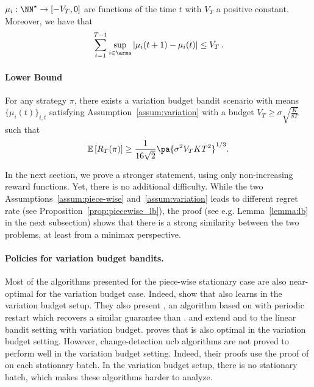 \begin{assumption}
\label{assum:variation}
$\mu_i : \NN^\star \rightarrow [- V_T, 0]$ are functions of the time $t$ with $V_T$ a positive constant. Moreover, we have that 
\begin{equation}
\label{eq:defbudget}
    \sum_{t=1}^{T-1} \sup_{i \in \arms} |\mu_i(t+1) - \mu_i(t) | \leq V_T\,.
\end{equation}
\end{assumption}


\paragraph{Lower Bound}
\begin{proposition}
\label{prop:variation_lb}
For any strategy $\pi$, there exists a  variation budget bandit scenario with means $\{\mu_i(t)\}_{i,t}$ satisfying Assumption~\ref{assum:variation} with a budget $V_T \geq \sigma \sqrt{\frac{K}{8T}}$ such that
%
\[
    \mathbb{E}\left[R_T(\pi)\right] \geq \frac{1}{16\sqrt{2}} \pa{\sigma^2 V_T KT^2}^{1/3}.
\]
\end{proposition}

In the next section, we prove a stronger statement, using only non-increasing reward functions. Yet, there is no additional difficulty. While the two Assumptions~\ref{assum:piece-wise} and~\ref{assum:variation} leads to different regret rate (see Proposition~\ref{prop:piecewise_lb}), the proof (see e.g. Lemma~\ref{lemma:lb} in the next subsection) shows that there is a strong similarity between the two problems, at least from a minimax perspective.

\paragraph{Policies for variation budget bandits.}
Most of the algorithms presented for the piece-wise stationary case are also near-optimal for the variation budget case. Indeed, \citet{besbes2014stochastic} show that \EXPS also learns in the variation budget setup. They also present \REXP, an algorithm based on \EXP with periodic restart which recovers a similar guarantee than \EXPS. \citet{cheung2019new} and \citet{russac2019weighted} extend \SWUCB and \DUCB to the linear bandit setting with variation budget. \citet{chen2019new} proves that \ADSWITCH is also optimal in the variation budget setting. However, change-detection ucb algorithms are not proved to perform well in the variation budget setting. Indeed, their proofs use the proof of \UCB on each stationary batch. In the variation budget setup, there is no stationary batch, which makes these algorithms harder to analyze. 


